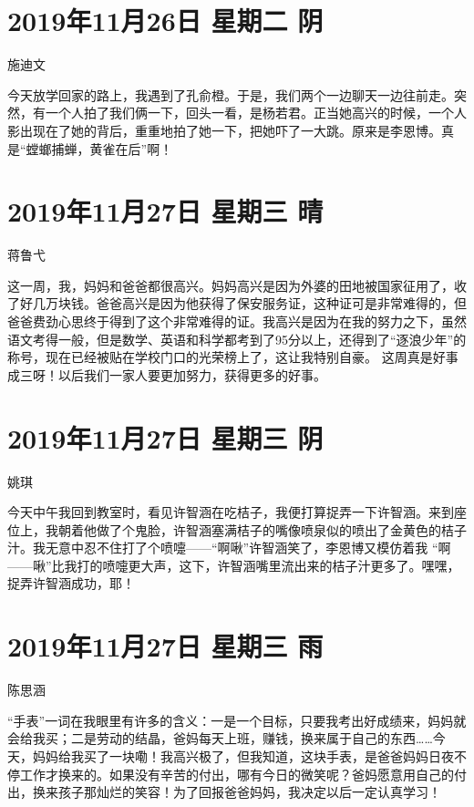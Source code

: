 \section{2019年11月26日 星期二 阴}

施迪文

今天放学回家的路上，我遇到了孔俞橙。于是，我们两个一边聊天一边往前走。突然，有一个人拍了我们俩一下，回头一看，是杨若君。正当她高兴的时候，一个人影出现在了她的背后，重重地拍了她一下，把她吓了一大跳。原来是李恩博。真是``螳螂捕蝉，黄雀在后''啊！

\section{2019年11月27日 星期三 晴}

蒋鲁弋

这一周，我，妈妈和爸爸都很高兴。妈妈高兴是因为外婆的田地被国家征用了，收了好几万块钱。爸爸高兴是因为他获得了保安服务证，这种证可是非常难得的，但爸爸费劲心思终于得到了这个非常难得的证。我高兴是因为在我的努力之下，虽然语文考得一般，但是数学、英语和科学都考到了95分以上，还得到了``逐浪少年''的称号，现在已经被贴在学校门口的光荣榜上了，这让我特别自豪。
这周真是好事成三呀！以后我们一家人要更加努力，获得更多的好事。

\section{2019年11月27日 星期三 阴}

姚琪

今天中午我回到教室时，看见许智涵在吃桔子，我便打算捉弄一下许智涵。来到座位上，我朝着他做了个鬼脸，许智涵塞满桔子的嘴像喷泉似的喷出了金黄色的桔子汁。我无意中忍不住打了个喷嚏------``啊啾''许智涵笑了，李恩博又模仿着我
``啊------啾''比我打的喷嚏更大声，这下，许智涵嘴里流出来的桔子汁更多了。嘿嘿，捉弄许智涵成功，耶！

\section{2019年11月27日 星期三 雨}

陈思涵

``手表''一词在我眼里有许多的含义：一是一个目标，只要我考出好成绩来，妈妈就会给我买；二是劳动的结晶，爸妈每天上班，赚钱，换来属于自己的东西\ldots\ldots 今天，妈妈给我买了一块嘞！我高兴极了，但我知道，这块手表，是爸爸妈妈日夜不停工作才换来的。如果没有辛苦的付出，哪有今日的微笑呢？爸妈愿意用自己的付出，换来孩子那灿烂的笑容！为了回报爸爸妈妈，我决定以后一定认真学习！

